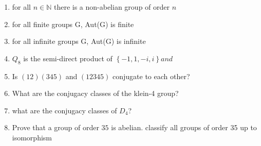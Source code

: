 \documentclass[12pt]{article}
\theoremstyle{definition} %
\theoremstyle{plain} %
\begin{document}
    \noindent
    \begin{enumerate}
        \item for all $n \in \mathbb{{N}}$ there is a non-abelian group of order $n$
        \item for all finite groups G, Aut(G) is finite  
        \item for all infinite groups G, Aut(G) is infinite  
        \item $Q_8$ is the semi-direct product of $\left\{ -1, 1, -i, i \right\} and$
        \item Is $(12)(345)$ and $(12345)$ conjugate to each other? 
        \item What are the conjugacy classes of the klein-4 group?
        \item what are the conjugacy classes of $D_4$?
        \item Prove that a group of order $35$ is abelian. classify all groups of order 35 up to isomorphism 
    \end{enumerate}
\end{document}
